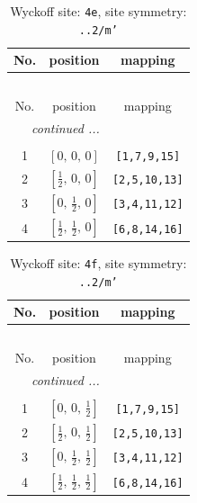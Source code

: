 \documentclass[fleqn,8pt]{jsarticle}
\begin{document}
\begin{longtable}{ccc}
\caption{Wyckoff site: {\tt 4e}, site symmetry: {\tt ..2/m'}}
 \\
 \hline \hline
No. & position & mapping \\ \hline \endfirsthead

\multicolumn{2}{l}{\tablename\ \thetable{}} \\
 \hline \hline
No. & position & mapping \\ \hline \endhead

 \hline \hline
\multicolumn{2}{r}{\footnotesize\it continued ...} \\ \endfoot

 \hline \hline
\multicolumn{2}{r}{} \\ \endlastfoot

1 & $\left[ 0,\, 0,\, 0 \right]$ & {\tt [1,7,9,15]} \\ \hline
2 & $\left[ \frac{1}{2},\, 0,\, 0 \right]$ & {\tt [2,5,10,13]} \\ \hline
3 & $\left[ 0,\, \frac{1}{2},\, 0 \right]$ & {\tt [3,4,11,12]} \\ \hline
4 & $\left[ \frac{1}{2},\, \frac{1}{2},\, 0 \right]$ & {\tt [6,8,14,16]} \\
\end{longtable}
\renewcommand{\arraystretch}{1.2}
\begin{longtable}{ccc}
\caption{Wyckoff site: {\tt 4f}, site symmetry: {\tt ..2/m'}}
 \\
 \hline \hline
No. & position & mapping \\ \hline \endfirsthead

\multicolumn{2}{l}{\tablename\ \thetable{}} \\
 \hline \hline
No. & position & mapping \\ \hline \endhead

 \hline \hline
\multicolumn{2}{r}{\footnotesize\it continued ...} \\ \endfoot

 \hline \hline
\multicolumn{2}{r}{} \\ \endlastfoot

1 & $\left[ 0,\, 0,\, \frac{1}{2} \right]$ & {\tt [1,7,9,15]} \\ \hline
2 & $\left[ \frac{1}{2},\, 0,\, \frac{1}{2} \right]$ & {\tt [2,5,10,13]} \\ \hline
3 & $\left[ 0,\, \frac{1}{2},\, \frac{1}{2} \right]$ & {\tt [3,4,11,12]} \\ \hline
4 & $\left[ \frac{1}{2},\, \frac{1}{2},\, \frac{1}{2} \right]$ & {\tt [6,8,14,16]} \\
\end{longtable}
\end{document}

